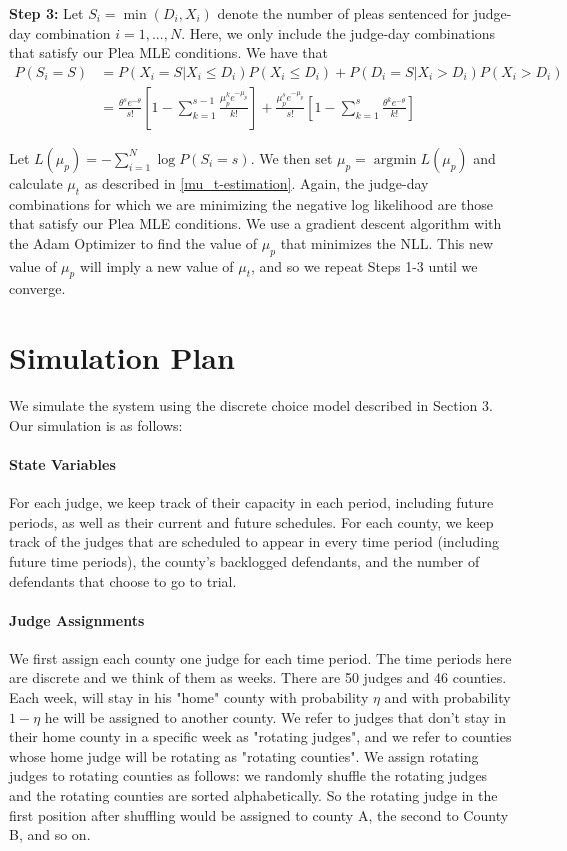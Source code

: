 \documentclass[11pt]{article}
\DeclareMathOperator*{\argmin}{argmin}
\theoremstyle{ModifiedStyle}
\theoremstyle{ModifiedStyle}
\begin{document}
      \noindent \textbf{Step 3:} Let $S_i = \min(D_i,X_i)$ denote the number of pleas sentenced for judge-day combination $i=1,...,N$. Here, we only include the judge-day combinations that satisfy our Plea MLE conditions. We have that
			\begin{align*}
				P(S_i = S) &= P(X_i = S | X_i \leq D_i) P(X_i \leq D_i) + P(D_i = S | X_i > D_i) P(X_i > D_i) \\
          &= \frac{\theta^s e^{-\theta}}{s!}[1-\sum_{k=1}^{s-1}\frac{\mu_p^k e^{-\mu_p}}{k!}] + \frac{\mu_p^s e^{-\mu_p}}{s!}[1-\sum_{k=1}^s \frac{\theta^k e^{-\theta}}{k!}]
			\end{align*}

      Let $L(\mu_p) = -\sum_{i=1}^N \log P(S_i = s)$. We then set
			 $\mu_p = \argmin L(\mu_p)$ and calculate $\mu_t$ as described in \ref{mu_t-estimation}. Again, the judge-day combinations for which we are minimizing the negative log likelihood are those that satisfy our Plea MLE conditions. We use a gradient descent algorithm with the Adam Optimizer to find the value of $\mu_p$ that minimizes the NLL. This new value of $\mu_p$ will imply a new value of $\mu_t$, and so we repeat Steps 1-3 until we converge.

\section{Simulation Plan}
  We simulate the system using the discrete choice model described in Section 3. Our simulation is as follows:

  \paragraph{State Variables} For each judge, we keep track of their capacity in each period, including future periods, as well as their current and future schedules. For each county, we keep track of the judges that are scheduled to appear in every time period (including future time periods), the county's backlogged defendants, and the number of defendants that choose to go to trial.

  \paragraph{Judge Assignments} We first assign each county one judge for each time period. The time periods here are discrete and we think of them as weeks. There are 50 judges and 46 counties. Each week, will stay in his "home" county with probability $\eta$ and with probability $1-\eta$ he will be assigned to another county. We refer to judges that don't stay in their home county in a specific week as "rotating judges", and we refer to counties whose home judge will be rotating as "rotating counties". We assign rotating judges to rotating counties as follows: we randomly shuffle the rotating judges and the rotating counties are sorted alphabetically. So the rotating judge in the first position after shuffling would be assigned to county A, the second to County B, and so on.
\end{document}

